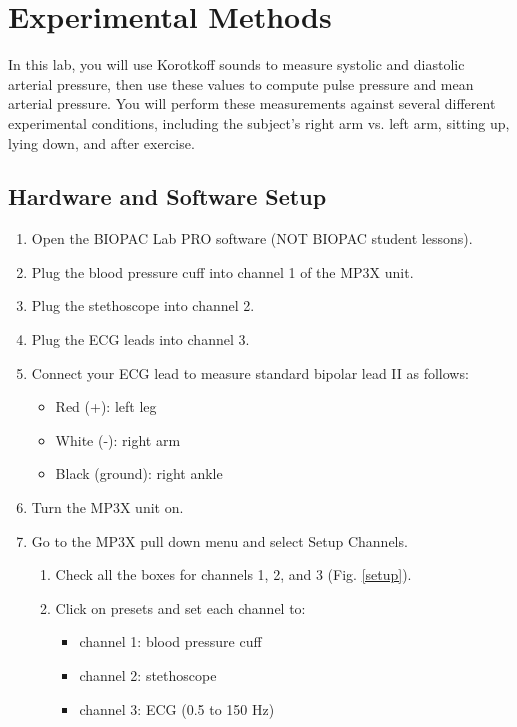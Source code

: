 \documentclass{article}
\begin{document}
\section*{Experimental Methods}
In this lab, you will use Korotkoff sounds to measure systolic and diastolic arterial pressure, then use these values to compute pulse pressure and mean arterial pressure. You will perform these measurements against several different experimental conditions, including the subject's right arm vs. left arm, sitting up, lying down, and after exercise.

\subsection*{Hardware and Software Setup}
\begin{enumerate}
	\item Open the BIOPAC Lab PRO software (NOT BIOPAC student lessons).
	\item Plug the blood pressure cuff into channel 1 of the MP3X unit.
	\item Plug the stethoscope into channel 2.
	\item Plug the ECG leads into channel 3.
	\item Connect your ECG lead to measure standard bipolar lead II as follows:\begin{itemize}
		\item Red (+): left leg
		\item White (-): right arm
		\item Black (ground): right ankle
	\end{itemize}
	\item Turn the MP3X unit on.
	\item Go to the MP3X pull down menu and select Setup Channels.
	\begin{enumerate}
		\item Check all the boxes for channels 1, 2, and 3 (Fig. \ref{setup}).
		\item Click on presets and set each channel to:\begin{itemize}
			\item channel 1: blood pressure cuff
			\item channel 2: stethoscope
			\item channel 3: ECG (0.5 to 150 Hz)
		\end{itemize}
	\end{enumerate}
\end{enumerate}
\end{document}
